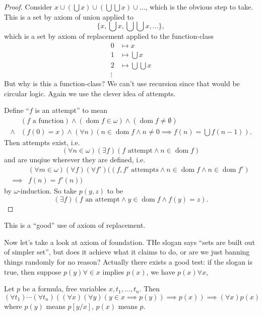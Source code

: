 \documentclass[a4paper]{article}
\DeclareMathOperator{\dom}{dom}%
\begin{document}
\begin{proof}
  Consider \(x \cup (\bigcup x) \cup (\bigcup \bigcup x) \cup \dots\), which is the obvious step to take. This is a set by axiom of union applied to
  \[
    \{x, \bigcup x, \bigcup \bigcup x, \dots\},
  \]
  which is a set by axiom of replacement applied to the function-class
  \begin{align*}
    0 &\mapsto x \\
    1 &\mapsto \bigcup x \\
    2 &\mapsto \bigcup \bigcup x \\
    \vdots
  \end{align*}
  But why is this a function-class? We can't use recursion since that would be circular logic. Again we use the clever idea of attempts.

  Define ``\(f\) is an attempt'' to mean
  \begin{align*}
    & (f \text{ a function}) \land (\dom f \in \omega) \land (\dom f \neq \emptyset) \\
    \land & (f(0) = x) \land (\forall n) (n \in \dom f \land n \neq 0 \implies f(n) = \bigcup f(n - 1)).
  \end{align*}
  Then attempts exist, i.e.
   \[
    (\forall n \in \omega) (\exists f) (f \text{ attempt} \land n \in \dom f)
  \]
  and are unqiue wherever they are defined, i.e.
  \begin{align*}
    & (\forall m \in \omega) (\forall f) (\forall f') ((f, f' \text{ attempts} \land n \in \dom f \land n \in \dom f') \\
    \implies & f(n) = f'(n))
  \end{align*}
  by \(\omega\)-induction. So take \(p(y, z)\) to be
  \[
    (\exists f) (f \text{ an attempt} \land y \in \dom f \land f(y) = z).
  \]
\end{proof}

\begin{remark}
  This is a ``good'' use of axiom of replacement.
\end{remark}

Now let's take a look at axiom of foundation. THe slogan says ``sets are built out of simpler set'', but does it achieve what it claims to do, or are we just banning things randomly for no reason? Actually there exists a good test: if the slogan is true, then suppose \(p(y) \forall \in x\) implies \(p(x)\), we have \(p(x) \forall x\), 

\begin{theorem}
  Let \(p\) be a formula, free variables \(x, t_1, \dots, t_n\). Then
  \[
    (\forall t_1) \cdots (\forall t_n) ((\forall x) (\forall y) (y \in x \implies p(y)) \implies p(x)) \implies (\forall x) p(x)
  \]
  where \(p(y)\) means \(p[y/x]\), \(p(x)\) means \(p\).
\end{theorem}
\end{document}
